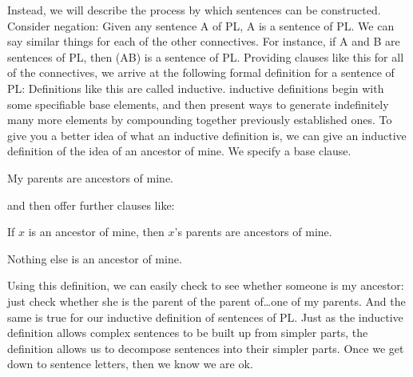 Instead, we will describe the process by which sentences can be constructed. Consider negation: Given any sentence A of PL, \enot A is a sentence of PL. We can say similar things for each of the other connectives. For instance, if A and B are sentences of PL, then (A\eand B) is a \gls{sentence of PL}. Providing clauses like this for all of the connectives, we arrive at the following formal definition for a sentence of PL:
Definitions like this are called inductive. inductive definitions begin with some specifiable base elements, and then present ways to generate indefinitely many more elements by compounding together previously established ones. To give you a better idea of what an inductive definition is, we can give an inductive definition of the idea of an ancestor of mine. We specify a base clause.
	\begin{ebullet}
		\item My parents are ancestors of mine.
	\end{ebullet}
and then offer further clauses like:
	\begin{ebullet}
		\item If $x$ is an ancestor of mine, then $x$'s parents are ancestors of mine.
		\item Nothing else is an ancestor of mine.
	\end{ebullet}
Using this definition, we can easily check to see whether someone is my ancestor: just check whether she is the parent of the parent of\ldots one of my parents. And the same is true for our inductive definition of sentences of PL. Just as the inductive definition allows complex sentences to be built up from simpler parts, the definition allows us to decompose sentences into their simpler parts. Once we get down to sentence letters, then we know we are ok.

